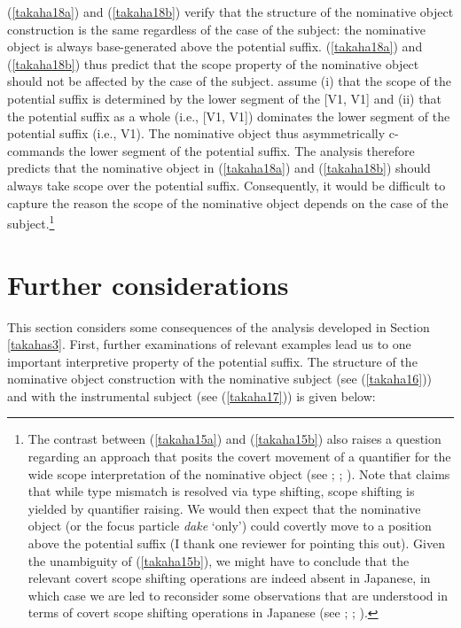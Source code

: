 \documentclass[output=paper]{langscibook}
\begin{document}
(\ref{takaha18a}) and (\ref{takaha18b}) verify that the structure of the nominative object construction is the same regardless of the case of the subject: the nominative object is always base-generated above the potential suffix. (\ref{takaha18a}) and (\ref{takaha18b}) thus predict that the scope property of the nominative object should not be affected by the case of the subject. \citet{SaitoHoshi1998} assume (i) that the scope of the potential suffix is determined by the lower segment of the [V1, V1] and (ii) that the potential suffix as a whole (i.e., [V1, V1]) dominates the lower segment of the potential suffix (i.e., V1). The nominative object thus asymmetrically c-commands the lower segment of the potential suffix. The analysis therefore predicts that the nominative object in (\ref{takaha18a}) and (\ref{takaha18b}) should always take scope over the potential suffix. Consequently, it would be difficult to capture the reason the scope of the nominative object depends on the case of the subject.\footnote{The contrast between (\ref{takaha15a}) and (\ref{takaha15b}) also raises a question regarding an approach that posits the covert movement of a quantifier for the wide scope interpretation of the nominative object (see \citealt{bobaljikwurmbrand2007}; \citealt{takahashi2011}; \citealt{FunakoshiTakahashi2014}). Note that \citet{Blok2017} claims that while type mismatch is resolved via type shifting, scope shifting is yielded by quantifier raising. We would then expect that the nominative object (or the focus particle \emph{dake} ‘only’) could covertly move to a position above the potential suffix (I thank one reviewer for pointing this out). Given the unambiguity of (\ref{takaha15b}), we might have to conclude that the relevant covert scope shifting operations are indeed absent in Japanese, in which case we are led to reconsider some observations that are understood in terms of covert scope shifting operations in Japanese (see \citealt{takahashi2011}; \citealt{BobaljikWurmbrand2012}; \citealt{Oku2018}).}

\section{Further considerations}\label{takahas5}
This section considers some consequences of the analysis developed in Section \ref{takahas3}. First, further examinations of relevant examples lead us to one important interpretive property of the potential suffix. The structure of the nominative object construction with the nominative subject (see (\ref{takaha16})) and with the instrumental subject (see (\ref{takaha17})) is given below: 	
\end{document}
